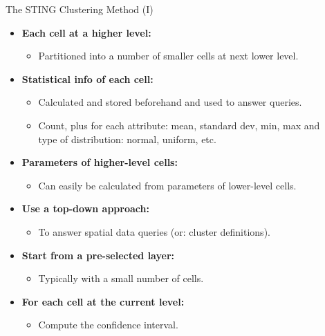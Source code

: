 \begin{frame}{The STING Clustering Method (I)}
	\begin{itemize}
		\item \textbf{Each cell at a higher level:}
		      \begin{itemize}
			      \item Partitioned into a number of smaller cells at next lower
			            level.
		      \end{itemize}
		\item \textbf{Statistical info of each cell:}
		      \begin{itemize}
			      \item Calculated and stored beforehand and used to answer queries.
			      \item Count, plus for each attribute: mean, standard dev, min, max
			            and \\
			            type of distribution: normal, uniform, etc.
		      \end{itemize}
		\item \textbf{Parameters of higher-level cells:}
		      \begin{itemize}
			      \item Can easily be calculated from parameters of lower-level cells.
		      \end{itemize}
		\item \textbf{Use a top-down approach:}
		      \begin{itemize}
			      \item To answer spatial data queries (or: cluster definitions).
		      \end{itemize}
		\item \textbf{Start from a pre-selected layer:}
		      \begin{itemize}
			      \item Typically with a small number of cells.
		      \end{itemize}
		\item \textbf{For each cell at the current level:}
		      \begin{itemize}
			      \item Compute the confidence interval.
		      \end{itemize}
	\end{itemize}
\end{frame}

